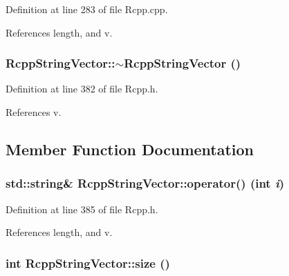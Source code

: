 Definition at line 283 of file Rcpp.cpp.

References length, and v.\hypertarget{classRcppStringVector_1b0550e206ac6945b00ee02c3c4bf373}{
\subsubsection[{$\sim$RcppStringVector}]{\setlength{\rightskip}{0pt plus 5cm}RcppStringVector::$\sim$RcppStringVector ()}}
\label{classRcppStringVector_1b0550e206ac6945b00ee02c3c4bf373}




Definition at line 382 of file Rcpp.h.

References v.

\subsection{Member Function Documentation}
\hypertarget{classRcppStringVector_ea5aa96f98f1c5b21e3c56ff60c7c413}{
\subsubsection[{operator()}]{\setlength{\rightskip}{0pt plus 5cm}std::string\& RcppStringVector::operator() (int {\em i})}}
\label{classRcppStringVector_ea5aa96f98f1c5b21e3c56ff60c7c413}




Definition at line 385 of file Rcpp.h.

References length, and v.\hypertarget{classRcppStringVector_c52a8eb61411546a62a70636709b1172}{
\subsubsection[{size}]{\setlength{\rightskip}{0pt plus 5cm}int RcppStringVector::size ()}}
\label{classRcppStringVector_c52a8eb61411546a62a70636709b1172}




